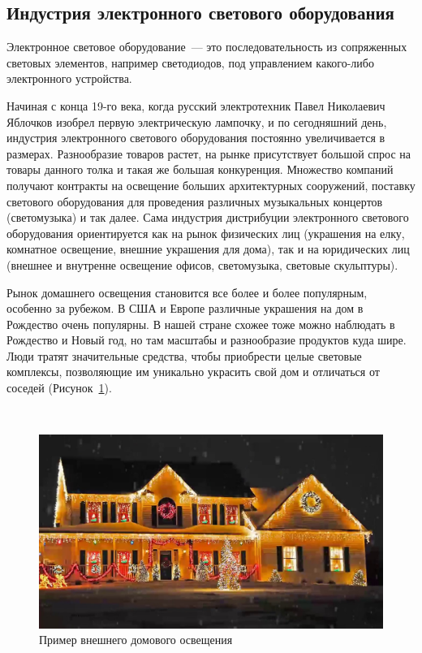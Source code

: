 \subsection{Индустрия электронного светового оборудования}
\label{sec:subject:industry}

Электронное световое оборудование~--- это последовательность из сопряженных световых элементов, например светодиодов, под управлением какого-либо электронного устройства.

Начиная с конца 19-го века, когда русский электротехник Павел Николаевич Яблочков изобрел первую электрическую лампочку, и по сегодняшний день, индустрия электронного светового оборудования постоянно увеличивается в размерах. Разнообразие товаров растет, на рынке присутствует большой спрос на товары данного толка и такая же большая конкуренция. Множество компаний получают контракты на освещение больших архитектурных сооружений, поставку светового оборудования для проведения различных музыкальных концертов (светомузыка) и так далее. Сама индустрия дистрибуции электронного светового оборудования ориентируется как на рынок физических лиц (украшения на елку, комнатное освещение, внешние украшения для дома), так и на юридических лиц (внешнее и внутренне освещение офисов, светомузыка, световые скульптуры). 

Рынок домашнего освещения становится все более и более популярным, особенно за рубежом. В США и Европе различные украшения на дом в Рождество очень популярны. В нашей стране схожее тоже можно наблюдать в Рождество и Новый год, но там масштабы и разнообразие продуктов куда шире. Люди тратят значительные средства, чтобы приобрести целые световые комплексы, позволяющие им уникально украсить свой дом и отличаться от соседей (Рисунок~\ref{fig:subject:industry:example}).

~
\begin{figure}[H]
\centering
	\includegraphics[scale=0.35]{figures/home_lightings.jpg}
	\caption{Пример внешнего домового освещения}
	\label{fig:subject:industry:example}
\end{figure}

